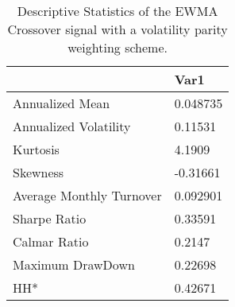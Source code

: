 \begin{table}[H]
\centering
\begin{tabular}{ll}
\hline& Var1 \\ 
\hline 
Annualized Mean & 0.048735 \\ 
Annualized Volatility & 0.11531 \\ 
Kurtosis & 4.1909 \\ 
Skewness & -0.31661 \\ 
Average Monthly Turnover & 0.092901 \\ 
Sharpe Ratio & 0.33591 \\ 
Calmar Ratio & 0.2147 \\ 
Maximum DrawDown & 0.22698 \\ 
HH* & 0.42671 \\ 
\hline
\end{tabular}
\caption{Descriptive Statistics of the EWMA Crossover signal with a volatility parity weighting scheme.}
\label{MBBSVPOQ}
\end{table}